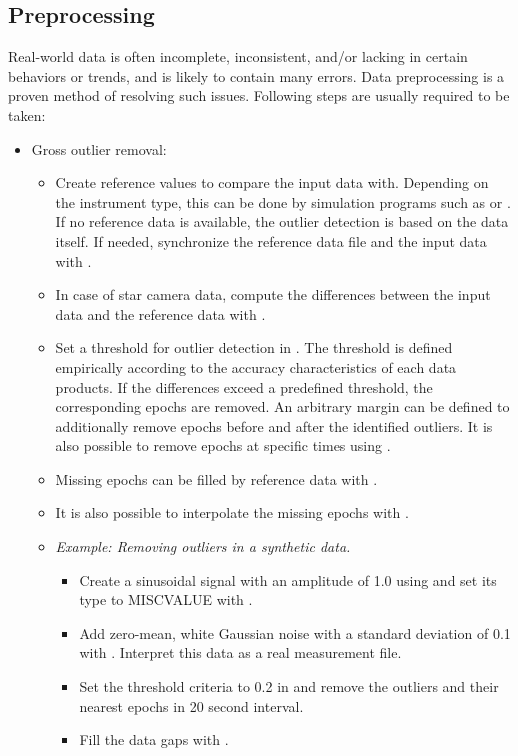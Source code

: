 \subsection{Preprocessing}
Real-world data is often incomplete, inconsistent, and/or lacking in certain behaviors or trends, and is likely to contain many errors. Data preprocessing is a proven method of resolving such issues. Following steps are usually required to be taken:

\begin{itemize}
\item Gross outlier removal:
  \begin{itemize}
  \item Create reference values to compare the input data with. Depending on the instrument type, this can be done by simulation programs such as  or . If no reference data is available, the outlier detection is based on the data itself. If needed, synchronize the reference data file and the input data with .

  \item In case of star camera data, compute the differences between the input data and the reference data with .

  \item Set a threshold for outlier detection in . The threshold is defined empirically according to the accuracy characteristics of each data products. If the differences exceed a predefined threshold, the corresponding epochs are removed. An arbitrary margin can be defined to additionally remove epochs before and after the identified outliers. It is also possible to remove epochs at specific times using .
  \item Missing epochs can be filled by reference data with .
  \item It is also possible to interpolate the missing epochs with .
  \item \emph{Example: Removing outliers in a synthetic data.}
  \begin{itemize}
  \item Create a sinusoidal signal with an amplitude of 1.0 using  and set its type to MISCVALUE with .
  \item Add zero-mean, white Gaussian noise with a standard deviation of 0.1 with . Interpret this data as a real measurement file.
  \item Set the threshold criteria to 0.2 in  and remove the outliers and their nearest epochs in 20 second interval.
  \item Fill the data gaps with .
  \end{itemize}
  \end{itemize}



\end{itemize}
